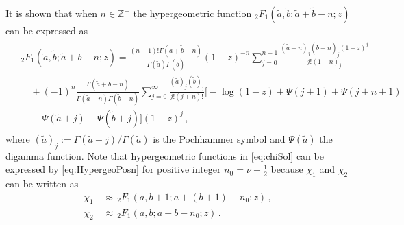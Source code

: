 \documentclass[11pt,a4paper]{article}
\begin{document}
It is shown \cite{Ceplak:2019ymw} that when 
$n \in \mathbb{Z}^{+}$
the hypergeometric function $_{2}F_{1}(\tilde{a}, \tilde{b}; \tilde{a} + \tilde{b} - n; z)$ can be expressed as
\begin{align}\label{eq:HypergeoPosn}
\begin{split}
&_{2}F_{1}(\tilde{a}, \tilde{b}; \tilde{a} + \tilde{b} - n; z) = \frac{(n - 1)!\Gamma(\tilde{a} + \tilde{b} - n)}{\Gamma(\tilde{a})\Gamma(\tilde{b})}(1-z)^{-n} \sum_{j=0}^{n-1}\frac{(\tilde{a} - n)_{j} (\tilde{b} - n)_{j}(1 - z)^{j}}{j!(1 - n)_{j}} \\
& \quad + (-1)^n\frac{\Gamma(\tilde{a} + \tilde{b} - n)}{\Gamma(\tilde{a} - n)\Gamma(\tilde{b} - n)}  \sum_{j=0}^{\infty} \frac{(\tilde{a})_{j}(\tilde{b})_{j}}{j!(j + n)!}\biggr[-\log(1 - z) + \Psi(j + 1) + \Psi(j + n + 1) \\
& \quad - \Psi(\tilde{a} + j) - \Psi(\tilde{b} + j)\biggr](1 - z)^{j}\,,
\end{split}
\end{align}
where $(\tilde{a})_j:={\Gamma(\tilde{a}+j)}/{\Gamma(\tilde{a})}$ is the Pochhammer symbol and $\Psi(\tilde{a})$ the digamma function. 
Note that hypergeometric functions in \eqref{eq:chiSol} can be expressed by \eqref{eq:HypergeoPosn} for positive integer $n_0=\nu-\frac{1}{2}$ because $\chi_1$ and $\chi_2$ can be written as
\begin{equation}
\begin{aligned}
    \chi_1 \, & \approx \, {}_2 F_{1}(a, b+1; a+(b+1)-n_0; z)\,, \\
    \chi_2 \, & \approx \, {}_2 F_{1}(a, b; a+b-n_0; z)\,.
\end{aligned}
\end{equation}
\end{document}

